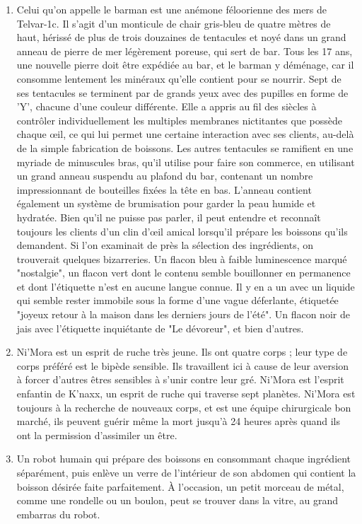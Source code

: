 \documentclass{article}
\begin{document}
\begin{enumerate}
	\item Celui qu'on appelle le barman est une anémone féloorienne des mers de Telvar-1c. Il s'agit d'un monticule de chair gris-bleu de quatre mètres de haut, hérissé de plus de trois douzaines de tentacules et noyé dans un grand anneau de pierre de mer légèrement poreuse, qui sert de bar. Tous les 17 ans, une nouvelle pierre doit être expédiée au bar, et le barman y déménage, car il consomme lentement les minéraux qu'elle contient pour se nourrir. Sept de ses tentacules se terminent par de grands yeux avec des pupilles en forme de 'Y', chacune d'une couleur différente. Elle a appris au fil des siècles à contrôler individuellement les multiples membranes nictitantes que possède chaque œil, ce qui lui permet une certaine interaction avec ses clients, au-delà de la simple fabrication de boissons. Les autres tentacules se ramifient en une myriade de minuscules bras, qu'il utilise pour faire son commerce, en utilisant un grand anneau suspendu au plafond du bar, contenant un nombre impressionnant de bouteilles fixées la tête en bas. L’anneau contient également un système de brumisation pour garder la peau humide et hydratée. Bien qu'il ne puisse pas parler, il peut entendre et reconnaît toujours les clients d'un clin d'œil amical lorsqu'il prépare les boissons qu'ils demandent. Si l'on examinait de près la sélection des ingrédients, on trouverait quelques bizarreries. Un flacon bleu à faible luminescence marqué "nostalgie", un flacon vert dont le contenu semble bouillonner en permanence et dont l'étiquette n'est en aucune langue connue. Il y en a un avec un liquide qui semble rester immobile sous la forme d'une vague déferlante, étiquetée "joyeux retour à la maison dans les derniers jours de l'été". Un flacon noir de jais avec l'étiquette inquiétante de "Le dévoreur", et bien d'autres.
	\item Ni'Mora est un esprit de ruche très jeune. Ils ont quatre corps ; leur type de corps préféré est le bipède sensible. Ils travaillent ici à cause de leur aversion à forcer d'autres êtres sensibles à s'unir contre leur gré. Ni'Mora est l'esprit enfantin de K'naxx, un esprit de ruche qui traverse sept planètes. Ni'Mora est toujours à la recherche de nouveaux corps, et est une équipe chirurgicale bon marché, ils peuvent guérir même la mort jusqu'à 24 heures après quand ils ont la permission d'assimiler un être.
	\item Un robot humain qui prépare des boissons en consommant chaque ingrédient séparément, puis enlève un verre de l'intérieur de son abdomen qui contient la boisson désirée faite parfaitement. À l'occasion, un petit morceau de métal, comme une rondelle ou un boulon, peut se trouver dans la vitre, au grand embarras du robot.

\end{enumerate}
\end{document}
